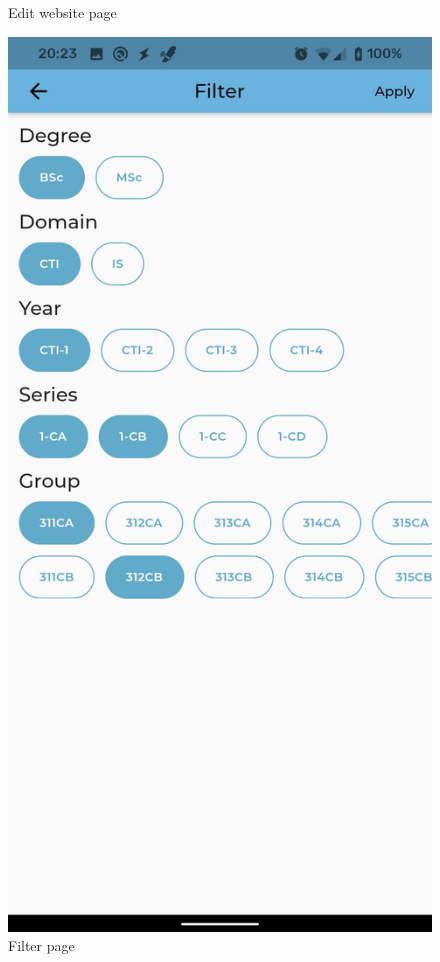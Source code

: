 \begin{figure}[!ht]
\begin{minipage}[b]{0.26\textwidth}
        \caption{Edit website page}
        \label{4:fig:website}
    \end{minipage}
    \hfill
    \begin{minipage}[b]{0.26\textwidth}
        \captionsetup{justification=centering}
        \includegraphics[width=\textwidth]{figures/app/flutter/filter.jpg}
        \caption{Filter page}
        \label{4:fig:filter}
    \end{minipage}
\end{figure}

